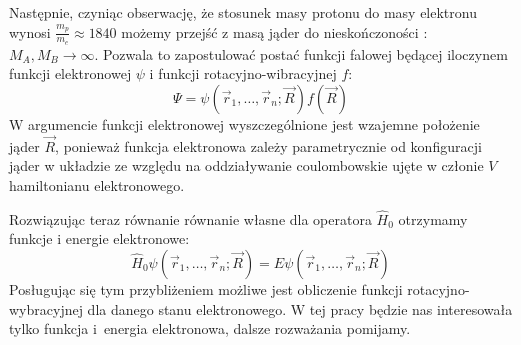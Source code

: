 \documentclass[a4paper,12pt]{article}
\numberwithin{equation}{section}
\numberwithin{table}{section}
\numberwithin{figure}{section}
\begin{document}
Następnie, czyniąc obserwację, że stosunek masy protonu do masy elektronu wynosi $\frac{m_p}{m_e} \approx 1840$ możemy przejść z masą jąder do nieskończoności \cite{kolos_kw}: $M_A,  M_B \rightarrow \infty$. Pozwala to zapostulować postać funkcji falowej będącej iloczynem funkcji elektronowej $\psi$ i funkcji rotacyjno-wibracyjnej $f$:
\begin{equation}
\Psi =  \psi(\vec{r}_1,\ldots,\vec{r}_n;\vec{R})f(\vec{R})
\end{equation}
W argumencie funkcji elektronowej wyszczególnione jest wzajemne położenie jąder $\vec{R}$, ponieważ funkcja elektronowa zależy parametrycznie od konfiguracji jąder w układzie ze względu na oddziaływanie coulombowskie ujęte w członie $V$ hamiltonianu elektronowego.

Rozwiązując teraz równanie równanie własne dla operatora $\hat{H}_0$ otrzymamy funkcje i energie elektronowe:
\begin{equation}
\hat{H}_0 \psi(\vec{r}_1,\ldots,\vec{r}_n;\vec{R}) = E  \psi(\vec{r}_1,\ldots,\vec{r}_n;\vec{R})
\end{equation}
Posługując się tym przybliżeniem możliwe jest obliczenie funkcji rotacyjno-wybracyjnej dla danego stanu elektronowego. W tej pracy będzie nas interesowała tylko funkcja \mbox{i energia} elektronowa, dalsze rozważania pomijamy.
\newpage
\end{document}
